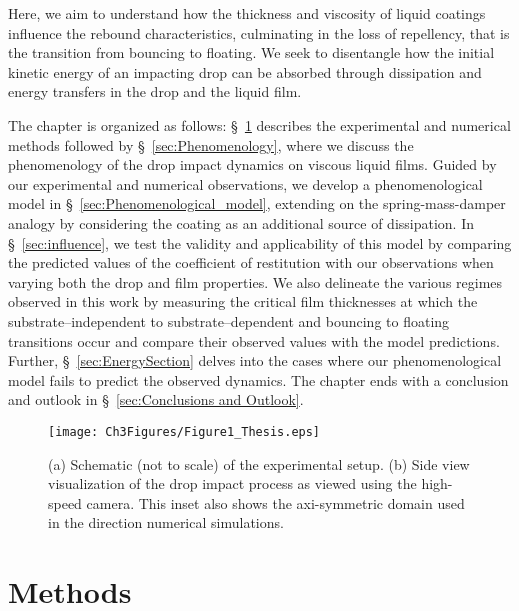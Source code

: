 Here, we aim to understand how the thickness and viscosity of liquid coatings influence the rebound characteristics, culminating in the loss of repellency, that is the transition from bouncing to floating. 
We seek to disentangle how the initial kinetic energy of an impacting drop can be absorbed through dissipation and energy transfers in the drop and the liquid film. 

The chapter is organized as follows: \S~\ref{sec:Methods} describes the experimental and numerical methods followed by \S~\ref{sec:Phenomenology}, where we discuss the phenomenology of the drop impact dynamics on viscous liquid films. 
Guided by our experimental and numerical observations, we develop a phenomenological model in \S~\ref{sec:Phenomenological_model}, extending on the spring-mass-damper analogy by considering the coating as an additional source of dissipation. In \S~\ref{sec:influence}, we test the validity and applicability of this model by comparing the predicted values of the coefficient of restitution with our observations when varying both the drop and film properties. 
We also delineate the various regimes observed in this work by measuring the critical film thicknesses at which the substrate--independent to substrate--dependent and bouncing to floating transitions occur and compare their observed values with the model predictions. Further, \S~\ref{sec:EnergySection} delves into the cases where our phenomenological model fails to predict the observed dynamics. The chapter ends with a conclusion and outlook in \S~\ref{sec:Conclusions and Outlook}.

\begin{figure}
	\centering
	\texttt{[image: Ch3Figures/Figure1\_Thesis.eps]}
	\caption{(a) Schematic (not to scale) of the experimental setup. (b) Side view visualization of the drop impact process as viewed using the high-speed camera. This inset also shows the axi-symmetric domain used in the direction numerical simulations.}
	\label{fig:schematic}
\end{figure}

\section{Methods}
\label{sec:Methods} %
